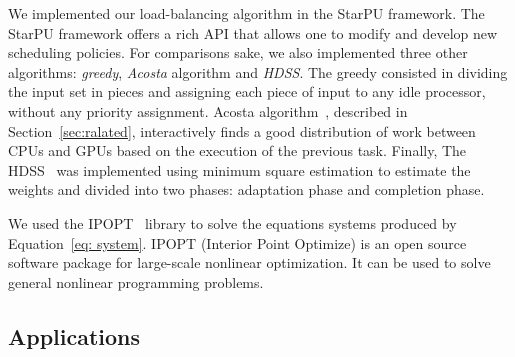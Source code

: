 \documentclass[journal]{IEEEtran}
\begin{document}

%
%

We implemented our load-balancing algorithm in the StarPU framework. The StarPU
framework offers a rich API that allows one to modify and develop new scheduling
policies. For comparisons sake, we also implemented three other algorithms:
\emph{greedy}, \emph{Acosta} algorithm and \emph{HDSS}. The greedy consisted in
dividing the input set in pieces and assigning each piece of input to any idle
processor, without any priority assignment. Acosta algorithm~\cite{acosta},
described in Section~\ref{sec:ralated}, interactively finds a good distribution
of work between CPUs and GPUs based on the execution of the previous task.
Finally, The HDSS~\cite{HDSS} was implemented using minimum square estimation to
estimate the weights and divided into two phases: adaptation phase and
completion phase.

We used the IPOPT~\cite{point} library to solve the equations systems produced
by Equation~\ref{eq: system}. IPOPT (Interior Point Optimize) is an open source
software package for large-scale nonlinear optimization. It can be used to solve
general nonlinear programming problems.

\subsection{Applications}
\end{document}
